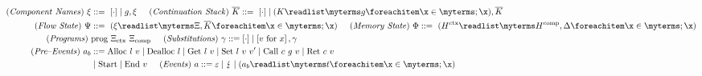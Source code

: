 \documentclass[acmsmall,review,screen,dvipsnames]{acmart}
\begin{document}
\begin{gather*}
\begin{aligned}
  \mi{(Component~Names)}~\commlib&\bnfdef\ \hole{\cdot} \mid g,\commlib \hspace{0.5cm}
  \mi{(Continuation~Stack)}~\ectxstack\bnfdef\ \hole{\cdot} \mid \tup{\ectx}{g},\ectxstack \\
  \mi{(Flow~State)}~\cfstate&\bnfdef\ \tup{\commlib}{\library,\ectxstack} \hspace{0.5cm}
  \mi{(Memory~State)}~\memstate\bnfdef\ \tup{\heap[^{\ctx}]}{\heap[^{\comp}],\store} \\
  \mi{(Programs)}~&\prog{\library_{\ctx}}{\library_{\comp}}\hspace{0.5cm}
  \mi{(Substitutions)}~\substvar\bnfdef \hole{\cdot} \mid \subst{\valueexpr}{x},\gamma \\
  \mi{(Pre\text{--}Events)}~\event[_{b}]&\bnfdef \ev{Alloc}\ \loc\ \valueexpr \mid \ev{Dealloc}\ \loc \mid \ev{Get}\ \loc\ \valueexpr \mid \ev{Set}\ \loc\ \valueexpr\ \valueexpr['] \mid \ev{Call}\ \comm\ g\ \valueexpr \mid \ev{Ret}\ \comm\ \valueexpr\\
    & \mid \ev{Start} \mid \ev{End}\ \valueexpr\hspace{0.5cm}
  \mi{(Events)}~\event\bnfdef \emptyevent \mid \lightning \mid \tup{\event[_{b}]}{\sandboxtag} \\
  \end{aligned}
\end{gather*}
\end{document}
